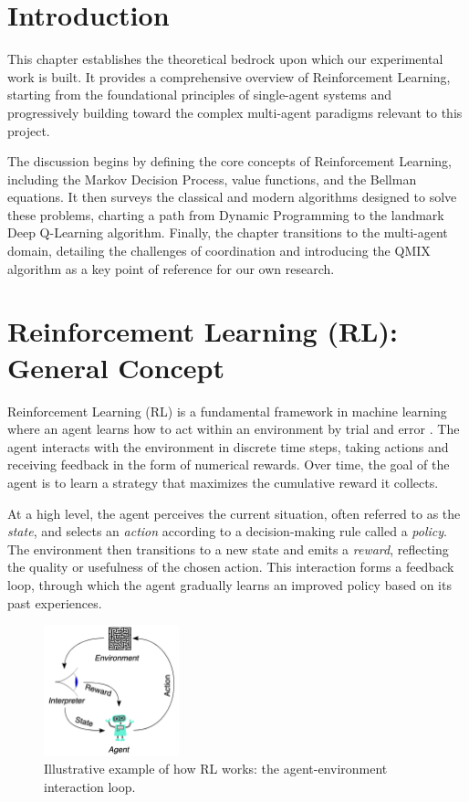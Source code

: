 \documentclass[../Main.tex]{subfiles}
\begin{document}
\section*{Introduction}

This chapter establishes the theoretical bedrock upon which our experimental work is built. It provides a comprehensive overview of Reinforcement Learning, starting from the foundational principles of single-agent systems and progressively building toward the complex multi-agent paradigms relevant to this project.

The discussion begins by defining the core concepts of Reinforcement Learning, including the Markov Decision Process, value functions, and the Bellman equations. It then surveys the classical and modern algorithms designed to solve these problems, charting a path from Dynamic Programming to the landmark Deep Q-Learning algorithm. Finally, the chapter transitions to the multi-agent domain, detailing the challenges of coordination and introducing the QMIX algorithm as a key point of reference for our own research.

\section{Reinforcement Learning (RL): General Concept}

Reinforcement Learning (RL) is a fundamental framework in machine learning where an agent learns how to act within an environment by trial and error \cite{sutton2018reinforcement}. The agent interacts with the environment in discrete time steps, taking actions and receiving feedback in the form of numerical rewards. Over time, the goal of the agent is to learn a strategy that maximizes the cumulative reward it collects.

At a high level, the agent perceives the current situation, often referred to as the \emph{state}, and selects an \emph{action} according to a decision-making rule called a \emph{policy}. The environment then transitions to a new state and emits a \emph{reward}, reflecting the quality or usefulness of the chosen action. This interaction forms a feedback loop, through which the agent gradually learns an improved policy based on its past experiences.

\begin{figure}[H]
    \centering
    \includegraphics[width=0.35\textwidth]{img/rl-diagram.png}
    \caption{Illustrative example of how RL works: the agent-environment interaction loop.}
    \label{fig:rl-loop}
\end{figure}
\end{document}

